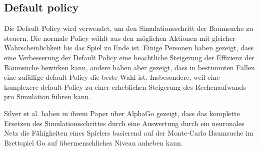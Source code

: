 \subsection{Default policy}
Die Default Policy wird verwendet, um den Simulationsschritt der Baumsuche zu steuern. Die normale Policy wählt aus den möglichen Aktionen mit gleicher Wahrscheinlichkeit bis das Spiel zu Ende ist. Einige Personen haben gezeigt, dass eine Verbesserung der Default Policy eine beachtliche Steigerung der Effizienz der Baumsuche bewirken kann, andere haben aber gezeigt, dass in bestimmten Fällen eine zufällige default Policy die beste Wahl ist. Insbesondere, weil eine komplexere default Policy zu einer erheblichen Steigerung des Rechenaufwands pro Simulation führen kann.
\par
Silver et al. haben in ihrem Paper über AlphaGo gezeigt, dass das komplette Ersetzen des Simulationsschrittes durch eine Auswertung durch ein neuronales Netz die Fähigkeiten eines Spielers basierend auf der Monte-Carlo Baumsuche im Brettspiel Go auf übermenschliches Niveau anheben kann.

